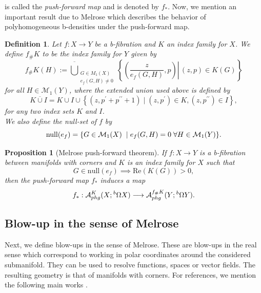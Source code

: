 \documentclass[a4paper,11pt]{article}
\newcounter{mythm}[section]
\newtheorem{defi}[mythm]{Definition}
\newtheorem{pr}[mythm]{Proposition}
\begin{document}
 is called the \emph{push-forward map} and is denoted by $f_{*}$. Now, we mention an important result due to Melrose \cite{melrose_calculus_1992} which describes the behavior of polyhomogeneous b-densities under the push-forward map. 
 \begin{defi}
     Let $f : X \rightarrow Y$ be a b-fibration and $K$ an index family for $X$. We define $f_{\#} K$ to be the index family for $Y$ given by 
     $$
f_{\#} K(H):=\overline{\bigcup}_{\substack{G \in M_1(X) \\ e_f(G, H) \neq 0}}\left\{\left.\left(\frac{z}{e_f(G, H)}, p\right) \right\rvert\,(z, p) \in K(G)\right\}
$$
for all $H \in \mathcal{M}_1(Y)$, where the extended union used above is defined by 
$$
K \overline{\cup} I=K \cup I \cup\left\{\left(z, p^{\prime}+p^{\prime \prime}+1\right) \mid\left(z, p^{\prime}\right) \in K,\left(z, p^{\prime \prime}\right) \in I\right\},
$$
for any two index sets $K$ and $I$.\\
We also define the null-set of $f$ by 
$$
\mathrm{null}(e_f) = \{ G \in \mathcal{M}_1(X) \hspace{0.2cm} | \hspace{0.1cm} e_f(G,H) =0 \hspace{0.1cm} \forall H \in \mathcal{M}_1(Y)\}.
$$
 \end{defi}
\begin{pr}[Melrose push-forward theorem] \label{fwd}
If $f : X \rightarrow Y$ is a b-fibration between manifolds with corners and $K$ is an index family for $X$ such that 
$$
G \in \mathrm{null}(e_f) \implies \mathrm{Re} (K(G)) >0,
$$
then the push-forward map $f_{*}$ induces a map 
$$
f_{*} : \mathcal{A}_{phg}^K(X; \hspace{0.01cm} ^{b} \Omega X) \longrightarrow \mathcal{A}_{phg}^{f_{\#} K}(Y; \hspace{0.01cm} ^{b} \Omega Y). 
$$
\end{pr}
\subsection{Blow-up in the sense of Melrose} \label{blow}
Next, we define blow-ups in the sense of Melrose. These are blow-ups in the real sense which correspond to working in polar coordinates around the considered submanifold. They can be used to resolve functions, spaces or vector fields. The resulting geometry is that of manifolds with corners. For references, we mention the following main works \cite{melrose_calculus_1992, melrose_atiyah-patodi-singer_1993, melrose_pseudodifferential_1990}.\\
\end{document}
